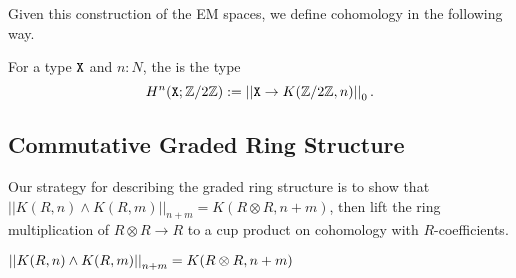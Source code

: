 \documentclass{amsart}
\begin{document}
Given this construction of the EM spaces, we define cohomology in the following way. 

\begin{definition}
	For a type $\mathtt{X}$ and $n:N$, the  is the type
	\[H^n(\mathtt{X};\mathbb{Z}/2\mathbb{Z}):= \left| \left| \mathtt{X}\rightarrow K(\mathbb{Z}/2\mathbb{Z},n)\right| \right|_0.\] 
\end{definition}



\subsection{Commutative Graded Ring Structure}



 Our strategy for describing the graded ring structure is to show that $||K(R,n)\wedge K(R,m)||_{n+m} = K(R\otimes R, n+m)$, then  lift the ring multiplication of $R \otimes R \to R$ to a cup product on cohomology with $R$-coefficients.



\begin{proposition}
	$ \left| \left| K(R,n) \wedge K(R,m)\right| \right|_{n+m} = K(R \otimes R, n+m)$
\end{proposition} 
\end{document}
